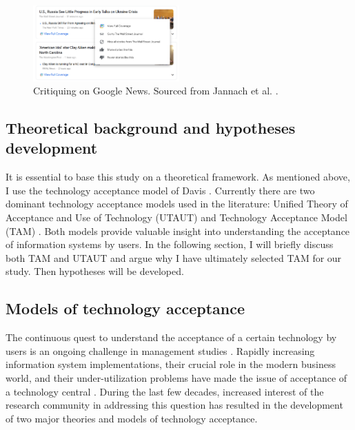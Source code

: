 \documentclass[a4paper,12pt]{article}
\newcommand{\citeyearonly}[1]{\citeyearpar{#1}}
\begin{document}
\begin{figure}[H]
    \centering
    \includegraphics[width=0.5\textwidth]{staticFiles/critiquingRS.PNG}
    \caption[Critiquing in RS]{Critiquing on Google News. Sourced from Jannach et al. \citeyearonly{jannach2017user}.}
    \label{fig:critiquing}
\end{figure}

\subsection{Theoretical background and hypotheses development}

It is essential to base this study on a theoretical framework. As mentioned above, I use the technology acceptance model of Davis \citeyearonly{davis1985technology}. Currently there are two dominant technology acceptance models used in the literature: Unified Theory of Acceptance and Use of Technology (UTAUT) and Technology Acceptance Model (TAM) \citep{davis1985technology, venkatesh2003utaut}. Both models provide valuable insight into understanding the acceptance of information systems by users. In the following section, I will briefly discuss both TAM and UTAUT and argue why I have ultimately selected TAM for our study. Then hypotheses will be developed.

\subsection{Models of technology acceptance}

The continuous quest to understand the acceptance of a certain technology by users is an ongoing challenge in management studies \citep{schwarz2007looking, williams2009contemporary}.  Rapidly increasing information system implementations, their crucial role in the modern business world, and their under-utilization problems have made the issue of acceptance of a technology central \citep{lancelotmiltgenDeterminantsEnduserAcceptance2013}. During the last few decades, increased interest of the research community in addressing this question has resulted in the development of two major theories and models of technology acceptance. 
\end{document}

